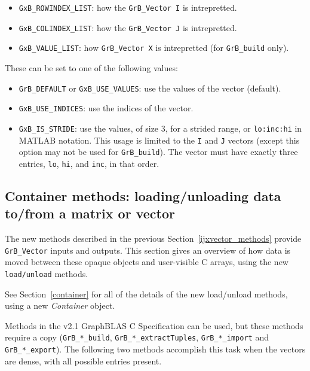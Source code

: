 \begin{itemize}
\item \verb'GxB_ROWINDEX_LIST': how the \verb'GrB_Vector I' is intrepretted.
\item \verb'GxB_COLINDEX_LIST': how the \verb'GrB_Vector J' is intrepretted.
\item \verb'GxB_VALUE_LIST': how \verb'GrB_Vector X' is intrepretted (for \verb'GrB_build' only).
\end{itemize}

These can be set to one of the following values:

\begin{itemize}
\item \verb'GrB_DEFAULT' or \verb'GxB_USE_VALUES': use the values of the vector (default).
\item \verb'GxB_USE_INDICES': use the indices of the vector.
\item \verb'GxB_IS_STRIDE': use the values, of size 3, for a strided range,
    or \verb'lo:inc:hi' in MATLAB notation.  This usage is limited to the
    \verb'I' and \verb'J' vectors (except this option may not be used for
    \verb'GrB_build').  The vector must have exactly three entries, 
    \verb'lo', \verb'hi', and \verb'inc', in that order.
\end{itemize}

\subsection{Container methods: loading/unloading data to/from a matrix or vector}
\label{container_v10}

The new methods described in the previous Section~\ref{ijxvector_methods}
provide \verb'GrB_Vector' inputs and outputs.  This section gives an overview
of how data is moved between these opaque objects and user-visible C arrays,
using the new \verb'load/unload' methods.

See Section~\ref{container} for all of the details of the new
load/unload methods, using a new {\em Container} object.

Methods in the v2.1 GraphBLAS C Specification can be used, but these methods
require a copy (\verb'GrB_*_build', \verb'GrB_*_extractTuples',
\verb'GrB_*_import' and \verb'GrB_*_export').  The following two methods
accomplish this task when the vectors are dense, with all possible entries
present.

